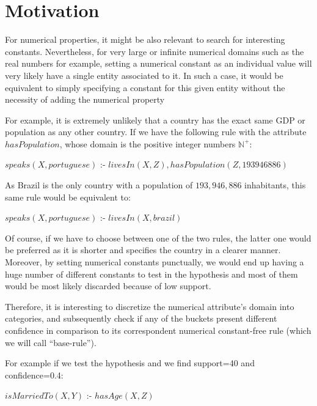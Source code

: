 
\section{Motivation}

For numerical properties, it might be also relevant to search for interesting constants. Nevertheless, for very large
or infinite numerical domains such as the real numbers for example, setting a numerical constant as an individual
value will very likely have a single entity associated to it. In such a case, it would be equivalent to simply
specifying a constant for this given entity without the necessity of adding the numerical property

For example, it is extremely unlikely that a country has the exact same GDP or population as any other country. If we
have the following rule with the attribute $hasPopulation$, whose domain is the positive integer numbers
$\mathbb{N}^+$:

\begin{center}
 $speaks(X,portuguese)$ :- $livesIn(X,Z),hasPopulation(Z,193946886)$
\end{center}

As Brazil is the only country with a population of $193,946,886$ inhabitants, this same rule would be equivalent to:

\begin{center}
 $speaks(X,portuguese)$ :- $livesIn(X,brazil)$
\end{center}

Of course, if we have to choose between one of the two rules, the latter one would be preferred as it is shorter and
specifies the country in a clearer manner. Moreover, by setting numerical constants punctually, we would end up having a
huge number of different constants to test in the hypothesis and most of them would be most likely discarded because of
low support.

Therefore, it is interesting to discretize the numerical attribute's domain into categories, and
subsequently check if any of the buckets present different confidence in comparison to its correspondent numerical
constant-free rule (which we will call ``base-rule'').

For example if we test the hypothesis and we find support=40 and confidence=0.4:

\begin{center}
 $isMarriedTo(X,Y)$ :- $hasAge(X,Z)$ 
\end{center}

